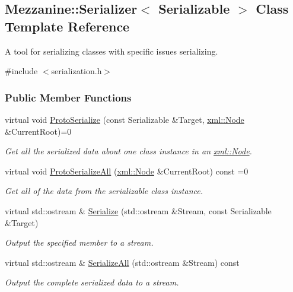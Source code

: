 \hypertarget{classMezzanine_1_1Serializer}{
\subsection{Mezzanine::Serializer$<$ Serializable $>$ Class Template Reference}
\label{classMezzanine_1_1Serializer}
}


A tool for serializing classes with specific issues serializing.  




{\ttfamily \#include $<$serialization.h$>$}

\subsubsection*{Public Member Functions}
\begin{DoxyCompactItemize}
\item 
virtual void \hyperlink{classMezzanine_1_1Serializer_af756e6eba414a1dca624d452abf4bf63}{ProtoSerialize} (const Serializable \&Target, \hyperlink{classMezzanine_1_1xml_1_1Node}{xml::Node} \&CurrentRoot)=0
\begin{DoxyCompactList}\small\item\em Get all the serialized data about one class instance in an \hyperlink{classMezzanine_1_1xml_1_1Node}{xml::Node}. \item\end{DoxyCompactList}\item 
virtual void \hyperlink{classMezzanine_1_1Serializer_a310e3fb563ccc12528ea9b8c25fcd7a8}{ProtoSerializeAll} (\hyperlink{classMezzanine_1_1xml_1_1Node}{xml::Node} \&CurrentRoot) const =0
\begin{DoxyCompactList}\small\item\em Get all of the data from the serializable class instance. \item\end{DoxyCompactList}\item 
virtual std::ostream \& \hyperlink{classMezzanine_1_1Serializer_af71f7716c36ba0a583ab1e29e08cac6d}{Serialize} (std::ostream \&Stream, const Serializable \&Target)
\begin{DoxyCompactList}\small\item\em Output the specified member to a stream. \item\end{DoxyCompactList}\item 
virtual std::ostream \& \hyperlink{classMezzanine_1_1Serializer_aa178dfa519a2e73e84c0a2f35b2b8b5f}{SerializeAll} (std::ostream \&Stream) const 
\begin{DoxyCompactList}\small\item\em Output the complete serialized data to a stream. \item\end{DoxyCompactList}\end{DoxyCompactItemize}


